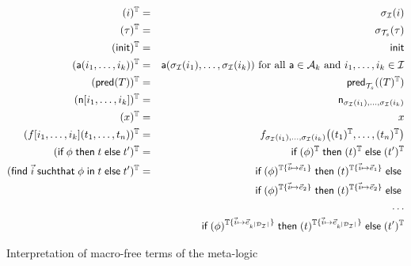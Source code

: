 \begin{figure}[t]
  \begin{eqnarray*}
    (i)^{\mathbb{T}} &=& \sigma_{\mathcal{I}}(i)
    \\
    (\tau)^{\mathbb{T}} &=& \sigma_{\mathcal{T}_s}(\tau) \\
    (\mathsf{init})^{\mathbb{T}} &=& \mathsf{init} \\
    (\textsf{a}(i_1,\ldots,i_k))^{\mathbb{T}} &=&
      \textsf{a}(\sigma_{\mathcal{I}}(i_1),\ldots,\sigma_{\mathcal{I}}(i_k))
      \text{ for all }
      \textsf{a}\in\mathcal{A}_k \text{ and } i_1,\ldots,i_k\in \mathcal{I} \\
    (\textsf{pred}(T))^{\mathbb{T}} &=&
      \mathsf{pred}_{\mathcal{T}_s}((T)^{\mathbb{T}})
    \\
    (\mathsf{n}[i_1,\ldots,i_k])^{\mathbb{T}} &=& \mathsf{n}_{\sigma_{\mathcal{I}}(i_1),\ldots,\sigma_{\mathcal{I}}(i_k)}
    \\
    (x)^{\mathbb{T}} &=& x
    \\
    (f[i_1,\ldots,i_k](t_1,\ldots,t_n))^{\mathbb{T}} &=&
    f_{\sigma_{\mathcal{I}}(i_1),\ldots,\sigma_{\mathcal{I}}(i_k)}\bigl(
      (t_1)^{\mathbb{T}},\ldots,(t_n)^{\mathbb{T}}
    \bigr)
    \\
    (\textsf{if}\; \phi \;\textsf{then}\; t \;\textsf{else}\; t')^{\mathbb{T}} &=&
    \textsf{if}\; (\phi)^{\mathbb{T}} \;\textsf{then}\; (t)^{\mathbb{T}} \;\textsf{else}\; (t')^{\mathbb{T}}
    \\
    (\textsf{find}\; \vec{i} \;\textsf{suchthat}\; \phi \;\textsf{in}\; t \;\textsf{else}\; t')^{\mathbb{T}} &=&
    \textsf{if}\; (\phi)^{\mathbb{T}\{\vec{i}\mapsto\vec{e}_1\}}
    \;\textsf{then}\; (t)^{\mathbb{T}\{\vec{i}\mapsto\vec{e}_1\}}
    \;\textsf{else}\; \\ & &
    \textsf{if}\; (\phi)^{\mathbb{T}\{\vec{i}\mapsto\vec{e}_2\}}
    \;\textsf{then}\; (t)^{\mathbb{T}\{\vec{i}\mapsto\vec{e}_2\}}
    \;\textsf{else}\; \\ & & \ldots \\ & &
    \textsf{if}\; (\phi)^{\mathbb{T}\{\vec{i}\mapsto\vec{e}_{k^{|\mathcal{D}_{\mathcal{I}}|}}\}}
    \;\textsf{then}\; (t)^{\mathbb{T}\{\vec{i}\mapsto\vec{e}_{k^{|\mathcal{D}_{\mathcal{I}}|}}\}}
    \;\textsf{else}\; (t')^{\mathbb{T}}
  \end{eqnarray*}
  \caption{Interpretation of macro-free terms of the meta-logic}
  \label{fig:interpt}
\end{figure}

